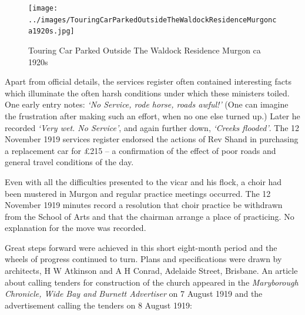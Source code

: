 \begin{figure}[!htb]
\begin{center}
\texttt{[image: ../images/TouringCarParkedOutsideTheWaldockResidenceMurgonca1920s.jpg]}
\caption{Touring Car Parked Outside The Waldock Residence Murgon ca 1920s}
\end{center}
\end{figure}




Apart from official details, the services register often contained interesting facts which illuminate the often harsh conditions under which these ministers toiled. One early entry notes: \emph{`No Service, rode horse, roads awful!'} (One can imagine the frustration after making such an effort, when no one else turned up.) Later he recorded \emph{`Very wet. No Service'}, and again further down, \emph{`Creeks flooded'}. The 12 November 1919 services register endorsed the actions of Rev Shand in purchasing a replacement car for \pounds215 -- a confirmation of the effect of poor roads and general travel conditions of the day.



Even with all the difficulties presented to the vicar and his flock, a choir had been mustered in Murgon and regular practice meetings occurred. The 12 November 1919 minutes record a resolution that choir practice be withdrawn from the School of Arts and that the chairman arrange a place of practicing. No explanation for the move was recorded.



Great steps forward were achieved in this short eight-month period and the wheels of progress continued to turn. Plans and specifications were drawn by architects, H W Atkinson and A H Conrad, Adelaide Street, Brisbane. An article about calling tenders for construction of the church appeared in the \emph{Maryborough Chronicle, Wide Bay and Burnett Advertiser} on 7 August 1919 and the advertisement calling the tenders on 8 August 1919:









